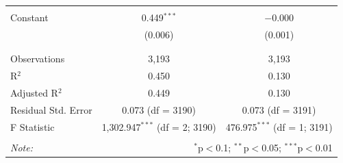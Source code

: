 \documentclass[12pt,letterpaper]{article}
\begin{document}
\begin{enumerate}
\begin{table}[!htbp]
\begin{tabular}{@{\extracolsep{5pt}}lcc}
				& & \\ 
				Constant & 0.449$^{***}$ & $-$0.000 \\ 
				& (0.006) & (0.001) \\ 
				& & \\ 
				\hline \\[-1.8ex] 
				Observations & 3,193 & 3,193 \\ 
				R$^{2}$ & 0.450 & 0.130 \\ 
				Adjusted R$^{2}$ & 0.449 & 0.130 \\ 
				Residual Std. Error & 0.073 (df = 3190) & 0.073 (df = 3191) \\ 
				F Statistic & 1,302.947$^{***}$ (df = 2; 3190) & 476.975$^{***}$ (df = 1; 3191) \\ 
				\hline 
				\hline \\[-1.8ex] 
				\textit{Note:}  & \multicolumn{2}{r}{$^{*}$p$<$0.1; $^{**}$p$<$0.05; $^{***}$p$<$0.01} \\ 
			\end{tabular} 
		\end{table} 
	\end{enumerate}
\end{document}

